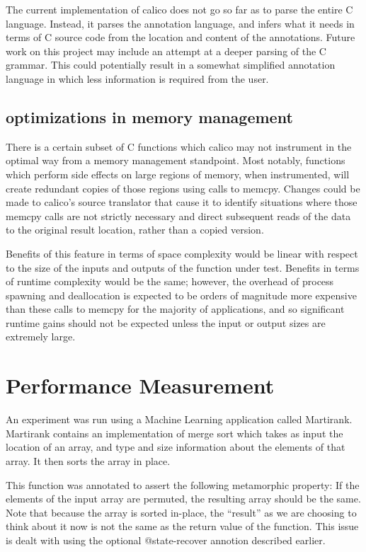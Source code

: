 \documentclass[notitlepage]{article}
\begin{document}
The current implementation of calico does not go so far as to parse the entire C language. Instead, it parses the annotation language, and infers what it needs in terms of C source code from the location and content of the annotations. Future work on this project may include an attempt at a deeper parsing of the C grammar. This could potentially result in a somewhat simplified annotation language in which less information is required from the user.

\subsection{optimizations in memory management}

There is a certain subset of C functions which calico may not instrument in the optimal way from a memory management standpoint. Most notably, functions which perform side effects on large regions of memory, when instrumented, will create redundant copies of those regions using calls to memcpy. Changes could be made to calico's source translator that cause it to identify situations where those memcpy calls are not strictly necessary and direct subsequent reads of the data to the original result location, rather than a copied version.

Benefits of this feature in terms of space complexity would be linear with respect to the size of the inputs and outputs of the function under test. Benefits in terms of runtime complexity would be the same; however, the overhead of process spawning and deallocation is expected to be orders of magnitude more expensive than these calls to memcpy for the majority of applications, and so significant runtime gains should not be expected unless the input or output sizes are extremely large.

\section{Performance Measurement}

An experiment was run using a Machine Learning application called Martirank. Martirank contains an implementation of merge sort which takes as input the location of an array, and type and size information about the elements of that array. It then sorts the array in place.

This function was annotated to assert the following metamorphic property: If the elements of the input array are permuted, the resulting array should be the same. Note that because the array is sorted in-place, the ``result'' as we are choosing to think about it now is not the same as the return value of the function. This issue is dealt with using the optional \ttfamily @state-recover \rmfamily annotion described earlier.
\end{document}
